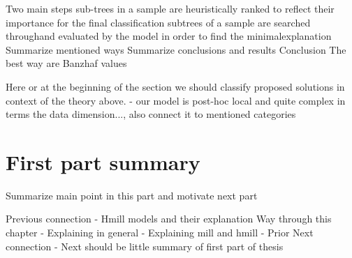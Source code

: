 
Two main steps
    sub-trees in a sample are heuristically ranked to reflect their importance for the final classification
    subtrees of a sample are searched throughand evaluated by the model in order to find the minimalexplanation
Summarize mentioned ways
Summarize conclusions and results
    Conclusion The best way are Banzhaf values

Here or at the beginning of the section we should classify proposed solutions in context of the theory above. - our model is post-hoc local and quite complex in terms the data dimension..., also connect it to mentioned categories


\section{First part summary}
Summarize main point in this part and motivate next part




Previous connection
- Hmill models and their explanation
Way through this chapter
- Explaining in general
- Explaining mill and hmill
- Prior
Next connection
- Next should be little summary of first part of thesis
